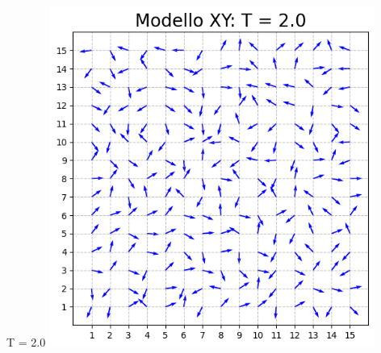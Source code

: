 \begin{frame}
\begin{columns}
\begin{column}{0.5\textwidth}
\begin{block}{T = 2.0}
                \centering
                \includegraphics[width=0.8\textwidth]{Immagini/backupXY/conf_T2.0.png}

            \end{block}
        \end{column}
    \end{columns}

\end{frame}



